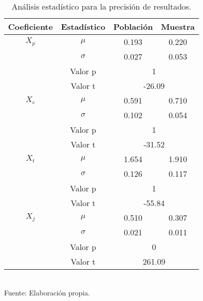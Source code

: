 \documentclass[12pt]{article} %
\begin{document}
\begin{table}[H]
    \caption{Análisis estadístico para la precisión de resultados.}
    \vspace{0.2cm}
    \centering
    \begin{tabular}{|c|c|c|c|}
    \hline
    \textbf{Coeficiente} & \textbf{Estadístico} & \textbf{Población} & \textbf{Muestra} \\ \hline
    $X_p$ & \multicolumn{1}{|c|}{\(\mu\)} & 0.193 & 0.220 \\ \cline{2-4}
    & \multicolumn{1}{|c|}{\(\sigma\)} & 0.027 & 0.053 \\ \cline{2-4}
    & \multicolumn{1}{|c|}{Valor p} & \multicolumn{2}{|c|}{1} \\ \cline{2-4}
    & \multicolumn{1}{|c|}{Valor t} & \multicolumn{2}{|c|}{-26.09} \\ \hline
    
    $X_e$ & \multicolumn{1}{|c|}{\(\mu\)} & 0.591 & 0.710 \\ \cline{2-4}
    & \multicolumn{1}{|c|}{\(\sigma\)} & 0.102 & 0.054 \\ \cline{2-4}
    & \multicolumn{1}{|c|}{Valor p} & \multicolumn{2}{|c|}{1} \\ \cline{2-4}
    & \multicolumn{1}{|c|}{Valor t} & \multicolumn{2}{|c|}{-31.52} \\ \hline
    
    $X_t$ & \multicolumn{1}{|c|}{\(\mu\)} & 1.654 & 1.910 \\ \cline{2-4}
    & \multicolumn{1}{|c|}{\(\sigma\)} & 0.126 & 0.117 \\ \cline{2-4}
    & \multicolumn{1}{|c|}{Valor p} & \multicolumn{2}{|c|}{1} \\ \cline{2-4}
    & \multicolumn{1}{|c|}{Valor t} & \multicolumn{2}{|c|}{-55.84} \\ \hline
    
    $X_j$ & \multicolumn{1}{|c|}{\(\mu\)} & 0.510 & 0.307 \\ \cline{2-4}
    & \multicolumn{1}{|c|}{\(\sigma\)} & 0.021 & 0.011 \\ \cline{2-4}
    & \multicolumn{1}{|c|}{Valor p} & \multicolumn{2}{|c|}{0} \\ \cline{2-4}
    & \multicolumn{1}{|c|}{Valor t} & \multicolumn{2}{|c|}{261.09} \\ \hline
    \end{tabular}
    \label{Precision_Resultados}
    \vspace{0.2cm}
    \\Fuente: Elaboración propia.
\end{table}
\end{document}
